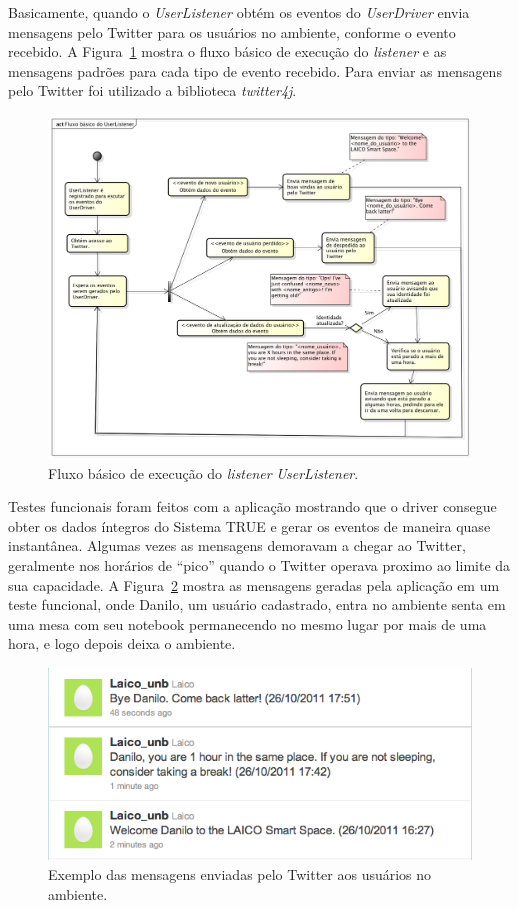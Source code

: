 	Basicamente, quando o \textit{UserListener} obtém os eventos do \textit{UserDriver} envia mensagens pelo Twitter para os usuários no ambiente, conforme o evento recebido. A Figura~\ref{fig:diagrama-tweet} mostra o fluxo básico de execução do \textit{listener} e as mensagens padrões para cada tipo de evento recebido. Para enviar as mensagens pelo Twitter foi utilizado a biblioteca \textit{twitter4j}. 

	\begin{figure}[hbt]
		\begin{center}
			\includegraphics[scale=0.45]{figuras/5.Testes/diagrama-user-tweet.png}
		\end{center}
		\caption{Fluxo básico de execução do \textit{listener} \textit{UserListener}.}
		\label{fig:diagrama-tweet}
	\end{figure}

	Testes funcionais foram feitos com a aplicação mostrando que o driver consegue
	obter os dados íntegros do Sistema TRUE e gerar os eventos de maneira quase
	instantânea. Algumas vezes as mensagens demoravam a chegar ao Twitter,
	geralmente nos horários de ``pico'' quando o Twitter operava proximo ao limite
	da sua capacidade. A Figura~\ref{fig:tweets} mostra as mensagens geradas
	pela aplicação em um teste funcional, onde Danilo, um usuário cadastrado,
	entra no ambiente senta em uma mesa com seu notebook permanecendo no mesmo
	lugar por mais de uma hora, e logo depois deixa o ambiente.

	\begin{figure}[hbt]
			\begin{center}
				\includegraphics[scale=0.6]{figuras/5.Testes/tweets.png}
			\end{center}
			\caption{Exemplo das mensagens enviadas pelo Twitter aos usuários no ambiente.}
			\label{fig:tweets}
		\end{figure}	